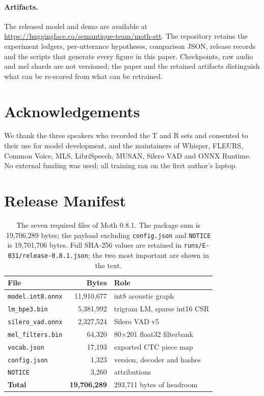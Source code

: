 \documentclass{article}
\newcommand{\moth}{Moth}
\begin{document}
\paragraph{Artifacts.}
The released model and demo are available at
\url{https://huggingface.co/semantique-team/moth-stt}. The repository retains the experiment
ledgers, per-utterance hypotheses, comparison JSON, release records and the scripts that generate
every figure in this paper. Checkpoints, raw audio and mel shards are not versioned; the paper and
the retained artifacts distinguish what can be re-scored from what can be retrained.

\section*{Acknowledgements}

We thank the three speakers who recorded the T and R sets and consented to their use for model
development, and the maintainers of Whisper, FLEURS, Common Voice, MLS, LibriSpeech, MUSAN,
Silero VAD and ONNX Runtime. No external funding was used; all training ran on the first author's
laptop.




\appendix

\section{Release Manifest}
\label{app:release}

\begin{table}[H]
\centering
\small
\setlength{\tabcolsep}{4pt}
\caption{The seven required files of \moth{} 0.8.1. The package sum is 19{,}706{,}289 bytes;
the payload excluding \texttt{config.json} and \texttt{NOTICE} is 19{,}701{,}706 bytes. Full
SHA-256 values are retained in \texttt{runs/E-031/release-0.8.1.json}; the two most important are
shown in the text.}
\label{tab:release}
\begin{tabular}{@{}lrl@{}}
\toprule
File & Bytes & Role \\
\midrule
\texttt{model.int8.onnx} & 11{,}910{,}677 & int8 acoustic graph \\
\texttt{lm\_bpe3.bin} & 5{,}381{,}992 & trigram LM, sparse int16 CSR \\
\texttt{silero\_vad.onnx} & 2{,}327{,}524 & Silero VAD v5 \\
\texttt{mel\_filters.bin} & 64{,}320 & 80$\times$201 float32 filterbank \\
\texttt{vocab.json} & 17{,}193 & exported CTC piece map \\
\texttt{config.json} & 1{,}323 & version, decoder and hashes \\
\texttt{NOTICE} & 3{,}260 & attributions \\
\midrule
\textbf{Total} & \textbf{19{,}706{,}289} & 293{,}711 bytes of headroom \\
\bottomrule
\end{tabular}
\end{table}
\end{document}
